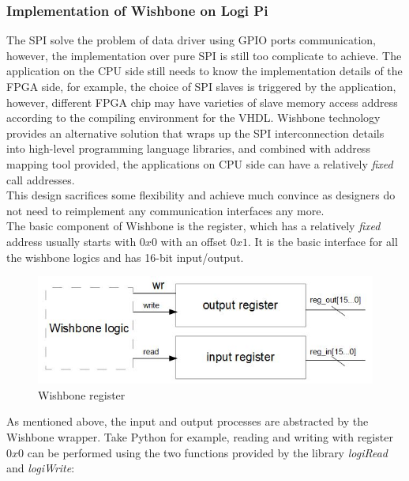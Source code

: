 \documentclass[11pt,openright,a4paper]{report}
\begin{document}
\subsubsection{Implementation of Wishbone on Logi Pi}
The SPI solve the problem of data driver using GPIO ports communication, however, the implementation over pure SPI is still too complicate to achieve. The application on the CPU side still needs to know the implementation details of the FPGA side, for example, the choice of SPI slaves is triggered by the application, however, different FPGA chip may have varieties of slave memory access address according to the compiling environment for the VHDL. Wishbone technology provides an alternative solution that wraps up the SPI interconnection details into high-level programming language libraries, and combined with address mapping tool provided, the applications on CPU side can have a relatively \textit{fixed} call addresses.\\
This design sacrifices some flexibility and achieve much convince as designers do not need to reimplement any communication interfaces any more.\\
The basic component of Wishbone is the register, which has a relatively \textit{fixed} address usually starts with $0x0$ with an offset $0x1$. It is the basic interface for all the wishbone logics and has 16-bit input/output\cite{logiwishbone}.\\
\begin{figure}[H]
\centering
\includegraphics[width=0.6\linewidth]{picture/wishbone_register}
\caption{Wishbone register}
\label{fig:wishbone_register}
\end{figure}
As mentioned above, the input and output processes are abstracted by the Wishbone wrapper. Take Python for example, reading and writing with register $0x0$ can be performed using the two functions provided by the library \textit{logiRead} and \textit{logiWrite}:
\end{document}
